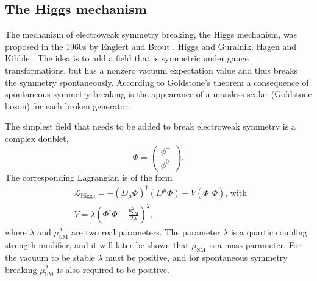 \subsection{The Higgs mechanism}
\label{sec:theory_sm_higgsmech}
The mechanism of electroweak symmetry breaking, the
Higgs mechanism, was proposed in the 1960s by Englert and Brout \cite{englertbrout},
Higgs \cite{higgs-I,higgs-II,higgs-III} and Guralnik, Hagen and Kibble \cite{GHK}.
The idea is to add a field that is symmetric under gauge transformations, but
has a nonzero vacuum expectation value and thus breaks the symmetry spontaneously.
According to Goldstone's theorem \cite{goldstone-theorem,goldstone-theorem-2} a 
consequence of spontaneous symmetry breaking is the appearance of a 
massless scalar (Goldstone boson) for each broken generator.

The simplest field that needs to be added to break electroweak symmetry is a complex doublet,
\begin{equation}\label{eqn:phi_hfield}
\Phi = \begin{pmatrix} \phi^{+} \\
\phi^{0} \end{pmatrix}.
\end{equation}
The corresponding Lagrangian is of the form
\begin{equation}\label{eqn:higgs_gen_lag}
\begin{split}
&\mathcal{L}_{\text{Higgs}} = -(D_{\mu}\Phi)^{\dagger}(D^{\mu}\Phi) - V(\Phi^{\dagger}\Phi) \text{, with }\\
&V = \lambda(\Phi^{\dagger}\Phi - \frac{\mu_{\text{SM}}^2}{2\lambda})^2,
\end{split}
\end{equation}
where $\lambda$ and $\mu_{\text{SM}}^2$ are two real parameters. The parameter $\lambda$ 
is a quartic coupling strength modifier, and it will later be shown 
that $\mu_{\text{SM}}$ is a mass parameter.
For the vacuum to be stable $\lambda$ must be positive,
and for spontaneous symmetry breaking $\mu_{\text{SM}}^2$ is also required to be positive.

